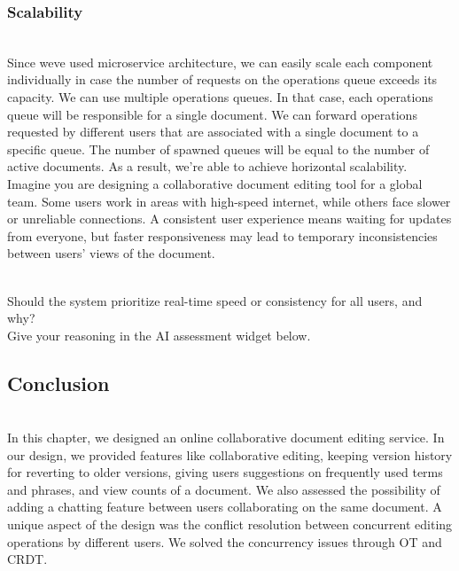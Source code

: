 \subsubsection{Scalability}\label{c_F1Yp9kSZNL0igmsOVCl-2}
\\
Since we\textquotesingle ve used microservice architecture, we can easily scale each component individually in case the number of requests on the operations queue exceeds its capacity. We can use multiple operations queues. In that case, each operations queue will be responsible for a single document. We can forward operations requested by different users that are associated with a single document to a specific queue. The number of spawned queues will be equal to the number of active documents. As a result, we're able to achieve horizontal scalability.
\\
Imagine you are designing a collaborative document editing tool for a global team. Some users work in areas with high-speed internet, while others face slower or unreliable connections. A consistent user experience means waiting for updates from everyone, but faster responsiveness may lead to temporary inconsistencies between users' views of the document.\\
\strut \\
Should the system prioritize real-time speed or consistency for all users, and why?\\
\textbf{\hfill\break
} Give your reasoning in the AI assessment widget below.

\subsection{Conclusion}\label{jZ3utsWz3CdBm6fuUaZaX}
\\
In this chapter, we designed an online collaborative document editing service. In our design, we provided features like collaborative editing, keeping version history for reverting to older versions, giving users suggestions on frequently used terms and phrases, and view counts of a document. We also assessed the possibility of adding a chatting feature between users collaborating on the same document. A unique aspect of the design was the conflict resolution between concurrent editing operations by different users. We solved the concurrency issues through OT and CRDT.

